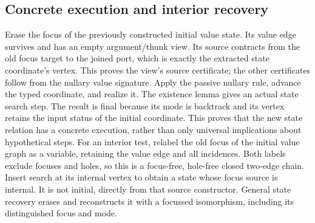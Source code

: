 \subsection{Concrete execution and interior recovery}
Erase the focus of the previously constructed initial value state. Its value
edge survives and has an empty argument/thunk view. Its source contracts from
the old focus target to the joined port, which is exactly the extracted state
coordinate's vertex. This proves the view's source certificate; the other
certificates follow from the nullary value signature.
Apply the passive nullary rule, advance the typed coordinate, and realize it.
The existence lemma gives an actual state search step. The result is final
because its mode is backtrack and its vertex retains the input status of the
initial coordinate. This proves that the new state relation has a concrete
execution, rather than only universal implications about hypothetical steps.
For an interior test, relabel the old focus of the initial value graph as a
variable, retaining the value edge and all incidences. Both labels exclude
focuses and holes, so this is a focus-free, hole-free closed two-edge chain.
Insert search at its internal vertex to obtain a state whose focus source is
internal. It is not initial, directly from that source constructor. General
state recovery erases and reconstructs it with a focussed isomorphism, including
its distinguished focus and mode.
